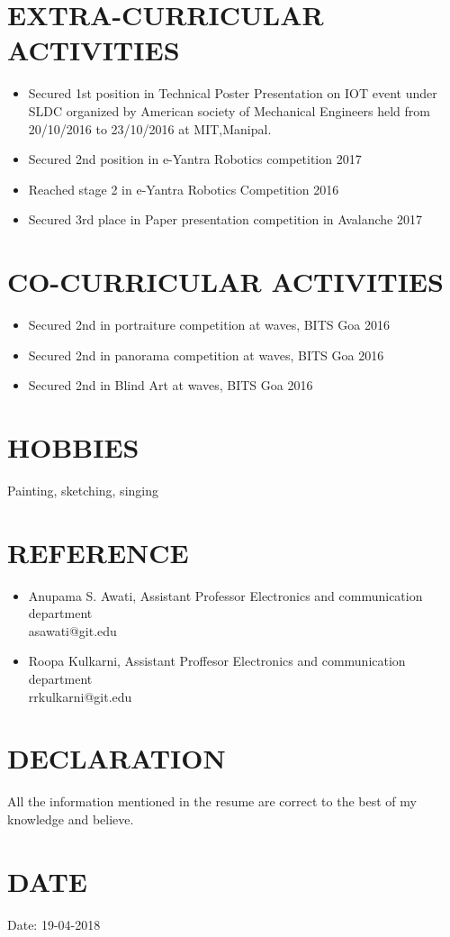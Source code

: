 \documentclass[paper=a4,fontsize=11pt]{scrartcl}
\newcommand{\NewPart}[1]{\section*{\uppercase{#1}}}
\begin{document}
\NewPart{Extra-Curricular Activities}
\begin{itemize}
\item Secured 1st position in Technical Poster Presentation on IOT event under
SLDC organized by American society of Mechanical Engineers held from
20/10/2016 to 23/10/2016 at MIT,Manipal.
\item Secured 2nd position in e-Yantra Robotics competition 2017
\item Reached stage 2 in e-Yantra Robotics Competition 2016
\item Secured 3rd place in Paper presentation competition in Avalanche 2017
\end{itemize}
\NewPart{Co-Curricular Activities}
\begin{itemize}

\item Secured 2nd in portraiture competition at waves, BITS Goa 2016
\item Secured 2nd in  panorama competition at waves, BITS Goa 2016
\item Secured 2nd  in Blind Art at waves, BITS Goa 2016
\end{itemize}

\NewPart{Hobbies}
Painting, sketching, singing
\NewPart{Reference}
\begin{itemize}
\item Anupama S. Awati, Assistant Professor Electronics and communication department\\
asawati@git.edu 
\item Roopa Kulkarni, Assistant Proffesor Electronics and communication department\\
rrkulkarni@git.edu
\end{itemize}
\NewPart{Declaration}
 {All the information mentioned in the resume are correct to the best of my knowledge and believe.}
\NewPart{Date}{Date: 19-04-2018}
\end{document}
